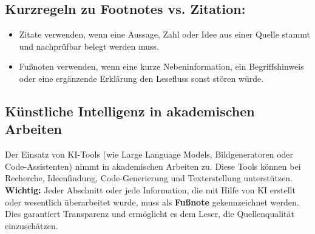 \subsection*{Kurzregeln zu Footnotes vs. Zitation:}

\begin{itemize}
  \item Zitate verwenden, wenn eine Aussage, Zahl oder Idee aus einer
  Quelle stammt und nachprüfbar belegt werden muss.
  \item Fußnoten verwenden, wenn eine kurze Nebeninformation, ein Begriffshinweis oder eine ergänzende Erklärung den Lesefluss sonst stören würde.
\end{itemize}






\subsection*{Künstliche Intelligenz in akademischen Arbeiten}

Der Einsatz von KI-Tools (wie Large Language Models, Bildgeneratoren oder Code-Assistenten) nimmt in akademischen Arbeiten zu. Diese Tools können bei Recherche, Ideenfindung, Code-Generierung und Texterstellung unterstützen. 
\textbf{Wichtig:} Jeder Abschnitt oder jede Information, die mit Hilfe von KI erstellt oder wesentlich überarbeitet wurde, muss als \textbf{Fußnote} gekennzeichnet werden. Dies garantiert Transparenz und ermöglicht es dem Leser, die Quellenqualität einzuschätzen.

